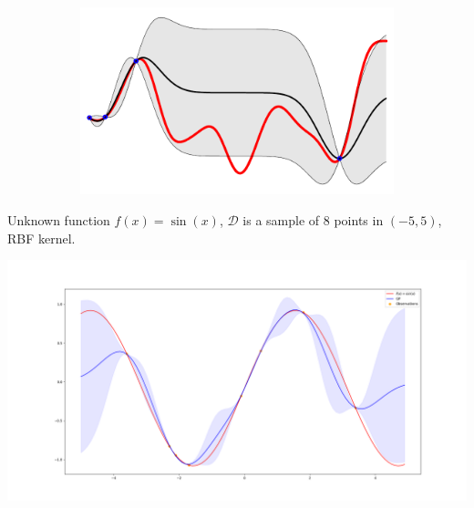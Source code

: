 \documentclass[10pt]{beamer}
\begin{document}
\begin{frame}
\begin{figure}
\begin{subfigure}[b]{0.475\textwidth}
        \end{subfigure}
        \hfill
        \begin{subfigure}[b]{0.475\textwidth}   
            \centering 
            \includegraphics[width=\textwidth]{imgs/GP_4}
        \end{subfigure}
    \end{figure}
\end{frame}

\begin{frame}

    Unknown function \( f(x) = \sin(x) \), \( \mathcal{D} \) is a sample of \( 8 \) points in \( (-5, 5) \), RBF kernel.

    \centering
    \includegraphics[scale = 0.2]{imgs/GP_post.png}
\end{frame}
\end{document}
